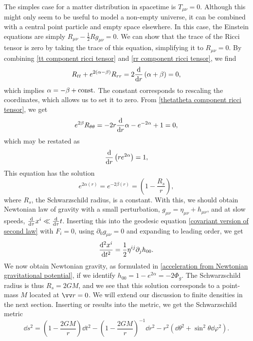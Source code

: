 The simples case for a matter distribution in spacetime is $T_{\mu \nu} = 0$.
Although this might only seem to be useful to model a non-empty universe, it can be combined with a central point particle and empty space elsewhere.
In this case, the Einstein equations are simply $R_{\mu \nu} - \frac{1}{2}R g_{\mu \nu} = 0$.
We can show that the trace of the Ricci tensor is zero by taking the trace of this equation, simplifying it to $R_{\mu \nu} = 0$.
By combining \autoref{tt component ricci tensor} and \autoref{rr component ricci tensor}, we find
%
\begin{equation}
    R_{tt} + e^{2(\alpha - \beta)}R_{rr} = 2 \odv{}{r} \left(\alpha + \beta\right) = 0,
\end{equation}
%
which implies $\alpha = -\beta + \mathrm{const.}$
The constant corresponds to rescaling the coordinates, which allows us to set it to zero.
From \autoref{thetatheta component ricci tensor}, we get
%
\begin{equation}
    e^{2 \beta} R_{\theta \theta} = - 2 r\odv{}{r} \alpha - e^{-2\alpha} + 1 = 0,
\end{equation}
%
which may be restated as
%
\begin{equation}
    \odv{}{r} \left(r e^{2 \alpha}\right) = 1,
\end{equation}
%
This equation has the solution
%
\begin{equation}
    e^{2\alpha(r)} = e^{-2 \beta(r)} = \left( 1- \frac{R_s}{r} \right),
\end{equation}
%
where $R_s$, the Schwarzschild radius, is a constant.
With this, we should obtain Newtonian law of gravity with a small perturbation, $g_{\mu \nu} = \eta_{\mu \nu} + h_{\mu \nu}$, and at slow speeds, $\odv*{x^i}{\tau} \ll \odv*{t}{\tau}$.
Inserting this into the geodesic equation \autoref{covariant version of second law} with $F_i = 0$, using $\partial_0 g_{\mu \nu} = 0$ and expanding to leading order, we get
%
\begin{equation}
    \odv[2]{x^i}{t} = \frac{1}{2}\eta^{i j}\partial_j h_{00}.
\end{equation}
%
We now obtain Newtonian gravity, as formulated in \autoref{acceleration from Newtonian gravitational potential}, if we identify $h_{00} = 1 -  e^{2\alpha} = - 2 \Phi_g$.
The Schwarzschild radius is thus $R_s = 2 G M$, and we see that this solution corresponds to a point-mass $M$ located at $\vv r = 0$.
We will extend our discussion to finite densities in the next section.
Inserting or results into the metric, we get the Schwarzschild metric
%
\begin{equation}
    \label{Schwarzchild metric}
    \dd s^2 
    = 
    \left( 1 - \frac{2 G M}{r} \right) \dd t^2
    -\left( 1 - \frac{2 G M}{r} \right)^{-1} \dd r^2
    - r^2 \left(\dd \theta^2 + \sin^2 \theta \dd \varphi^2\right).
\end{equation}
%





